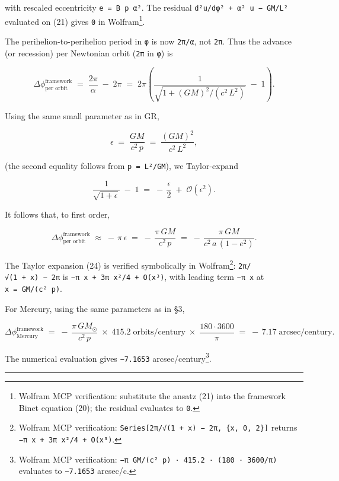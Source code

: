 \documentclass[
  11pt,
]{article}
\begin{document}
with rescaled eccentricity \texttt{e\textquotesingle{}\ =\ B\ p\ α²}.
The residual \texttt{d²u/dφ²\ +\ α²\ u\ −\ GM/L²} evaluated on (21)
gives \texttt{0} in Wolfram\footnote{Wolfram MCP verification:
  substitute the ansatz (21) into the framework Binet equation (20); the
  residual evaluates to \texttt{0}.}.

The perihelion-to-perihelion period in \texttt{φ} is now \texttt{2π/α},
not \texttt{2π}. Thus the advance (or recession) per Newtonian orbit
(\texttt{2π} in \texttt{φ}) is

\[
\Delta\phi^{\text{framework}}_{\text{per orbit}}
\;=\; \frac{2\pi}{\alpha} \;-\; 2\pi
\;=\; 2\pi\!\left(\frac{1}{\sqrt{1 + (GM)^{2}/(c^{2}\,L^{2})}} \;-\; 1\right). \tag{22}
\]

Using the same small parameter as in GR,

\[
\epsilon \;=\; \frac{GM}{c^{2}\,p} \;=\; \frac{(GM)^{2}}{c^{2}\,L^{2}}, \tag{23}
\]

(the second equality follows from \texttt{p\ =\ L²/GM}), we
Taylor-expand

\[
\frac{1}{\sqrt{1+\epsilon}} \;-\; 1
\;=\; -\,\frac{\epsilon}{2} \;+\; \mathcal{O}(\epsilon^{2}). \tag{24}
\]

It follows that, to first order,

\[
\Delta\phi^{\text{framework}}_{\text{per orbit}}
\;\approx\; -\,\pi\,\epsilon
\;=\; -\,\frac{\pi\,GM}{c^{2}\,p}
\;=\; -\,\frac{\pi\,GM}{c^{2}\,a\,(1-e^{2})}. \tag{25}
\]

The Taylor expansion (24) is verified symbolically in
Wolfram\footnote{Wolfram MCP verification:
  \texttt{Series{[}2π/√(1\ +\ x)\ −\ 2π,\ \{x,\ 0,\ 2\}{]}} returns
  \texttt{−π\ x\ +\ 3π\ x²/4\ +\ O(x³)}.}: \texttt{2π/√(1\ +\ x)\ −\ 2π}
is \texttt{−π\ x\ +\ 3π\ x²/4\ +\ O(x³)}, with leading term
\texttt{−π\ x} at \texttt{x\ =\ GM/(c²\ p)}.

For Mercury, using the same parameters as in §3,

\[
\Delta\phi^{\text{framework}}_{\text{Mercury}}
\;=\; -\,\frac{\pi\,GM_{\odot}}{c^{2}\,p}
\;\times\; 415.2\;\text{orbits/century}
\;\times\; \frac{180 \cdot 3600}{\pi}
\;=\; -\,7.17\;\text{arcsec/century}. \tag{26}
\]

The numerical evaluation gives \texttt{−7.1653}
arcsec/century\footnote{Wolfram MCP verification:
  \texttt{−π\ GM/(c²\ p)\ ·\ 415.2\ ·\ (180\ ·\ 3600/π)} evaluates to
  \texttt{−7.1653} arcsec/c.}.

\begin{center}\rule{0.5\linewidth}{0.5pt}\end{center}
\end{document}
